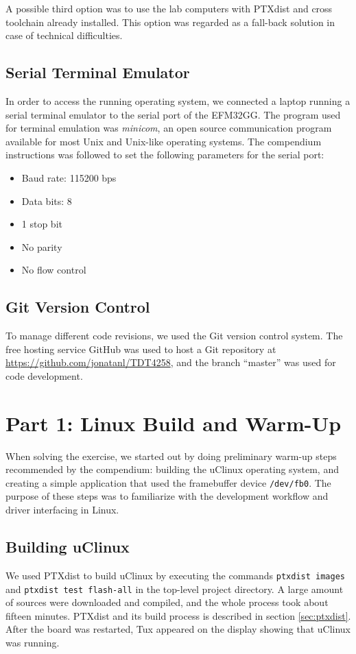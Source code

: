 A possible third option was to use the lab computers with PTXdist and cross toolchain already installed. This option was regarded as a fall-back solution in case of technical difficulties.

\subsection{Serial Terminal Emulator}\label{sec:serial-terminal-emulator}
In order to access the running operating system, we connected a laptop running a serial terminal emulator to the serial port of the EFM32GG. The program used for terminal emulation was \emph{minicom}, an open source communication program available for most Unix and Unix-like operating systems.\cite{minicom-man-page} The compendium instructions was followed to set the following parameters for the serial port:
\begin{itemize}
  \item Baud rate: 115200 bps
  \item Data bits: 8
  \item 1 stop bit
  \item No parity
  \item No flow control
\end{itemize}

\subsection{Git Version Control}
To manage different code revisions, we used the Git version control system. The free hosting service GitHub was used to host a Git repository at \url{https://github.com/jonatanl/TDT4258}, and the branch ``master'' was used for code development.


\section{Part 1: Linux Build and Warm-Up}
When solving the exercise, we started out by doing preliminary warm-up steps recommended by the compendium: building the uClinux operating system, and creating a simple application that used the framebuffer device \texttt{/dev/fb0}. The purpose of these steps was to familiarize with the development workflow and driver interfacing in Linux.

\subsection{Building uClinux}
We used PTXdist to build uClinux by executing the commands \texttt{ptxdist images} and \texttt{ptxdist test flash-all} in the top-level project directory. A large amount of sources were downloaded and compiled, and the whole process took about fifteen minutes. PTXdist and its build process is described in section \ref{sec:ptxdist}. After the board was restarted, Tux appeared on the display showing that uClinux was running.

